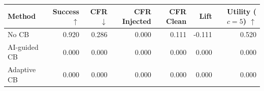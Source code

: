 \begin{tabular}{lrrrrrr}
\toprule
Method & Success $\uparrow$ & CFR $\downarrow$ & CFR Injected & CFR Clean & Lift & Utility ($c=5$) $\uparrow$ \\
\midrule
No CB & 0.920 & 0.286 & 0.000 & 0.111 & -0.111 & 0.520 \\
AI-guided CB & 0.000 & 0.000 & 0.000 & 0.000 & 0.000 & 0.000 \\
Adaptive CB & 0.000 & 0.000 & 0.000 & 0.000 & 0.000 & 0.000 \\
\bottomrule
\end{tabular}
